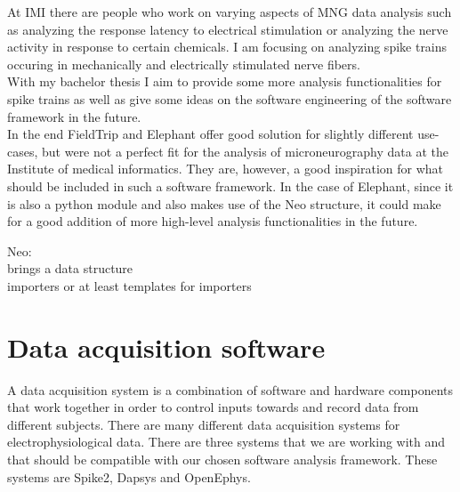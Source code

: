 At IMI there are people who work on varying aspects of MNG data analysis such as analyzing the response latency to electrical stimulation or analyzing the nerve activity in response to certain chemicals. I am focusing on analyzing spike trains occuring in mechanically and electrically stimulated nerve fibers.\\
With my bachelor thesis I aim to provide some more analysis functionalities for spike trains as well as give some ideas on the software engineering of the software framework in the future.\\
In the end FieldTrip and Elephant offer good solution for slightly different use-cases, but were not a perfect fit for the analysis of microneurography data at the Institute of medical informatics. They are, however, a good inspiration for what should be included in such a software framework. In the case of Elephant, since it is also a python module and also makes use of the Neo structure, it could make for a good addition of more high-level analysis functionalities in the future.



Neo:\\
brings a data structure\\
importers or at least templates for importers



\section{Data acquisition software} 
A data acquisition system is a combination of software and hardware components that work together in order to control inputs towards and record data from different subjects.
There are many different data acquisition systems for electrophysiological data. There are three systems that we are working with and that should be compatible with our chosen software analysis framework. These systems are Spike2, Dapsys and OpenEphys.

